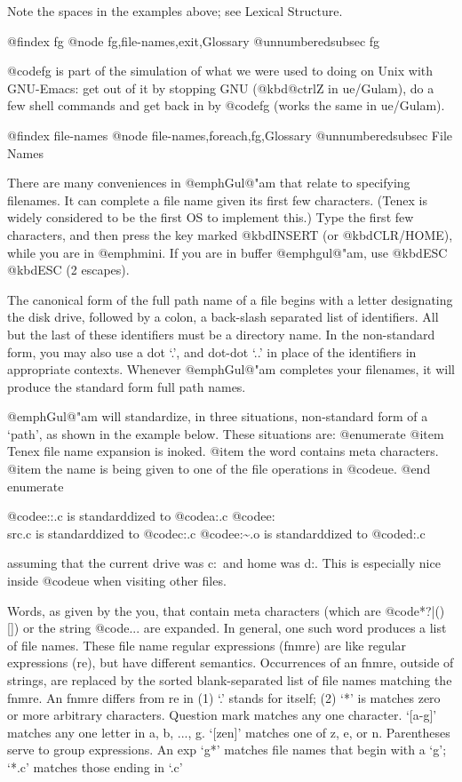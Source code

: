 {{Note the spaces in the examples above; see Lexical Structure.  

@findex fg
@node fg,file-names,exit,Glossary
@unnumberedsubsec fg

@code{fg} is part of the simulation of what we were used to doing on Unix
with GNU-Emacs: get out of it by stopping GNU (@kbd{@ctrl{Z}} in ue/Gulam),
do a few shell commands and get back in by @code{fg} (works the same in
ue/Gulam).


@findex file-names
@node file-names,foreach,fg,Glossary
@unnumberedsubsec File Names

There are many conveniences in @emph{Gul@"am} that relate to specifying
filenames.  It can complete a file name given its first few characters.
(Tenex is widely considered to be the first OS to implement this.) Type the
first few characters, and then press the key marked @kbd{INSERT} (or
@kbd{CLR/HOME}), while you are in @emph{mini}.  If you are in buffer
@emph{gul@"am}, use @kbd{ESC} @kbd{ESC} (2 escapes).

The canonical form of the full path name of a file begins with a letter
designating the disk drive, followed by a colon, a back-slash separated
list of identifiers.  All but the last of these identifiers must be a
directory name.  In the non-standard form, you may also use a dot `.', and
dot-dot `..' in place of the identifiers in appropriate contexts.  Whenever
@emph{Gul@"am} completes your filenames, it will produce the standard form
full path names.

@emph{Gul@"am} will standardize, in three situations, non-standard form of
a `path', as shown in the example below.  These situations are:
@enumerate
@item
Tenex file name expansion is inoked.
@item
the word contains meta characters.
@item
the name is being given to one of the file operations in @code{ue}.
@end enumerate

@code{e:\gulam\a:\lex.c} is standarddized to @code{a:\lex.c}
@code{e:\gulam\\src\util.c} is standarddized to @code{c:\src\util.c}
@code{e:\gulam\~\ex.o} is standarddized to @code{d:\bin\ex.c}

assuming that the current drive was c:\, and home was d:\bin.  This is
especially nice inside @code{ue} when visiting other files.

Words, as given by the you, that contain meta characters (which are
@code{*?|()[]}) or the string @code{...} are expanded.  In general, one
such word produces a list of file names.  These file name regular
expressions (fnmre) are like regular expressions (re), but have different
semantics.  Occurrences of an fnmre, outside of strings, are replaced by
the sorted blank-separated list of file names matching the fnmre.  An fnmre
differs from re in (1) `.' stands for itself; (2) `*' is matches zero or
more arbitrary characters.  Question mark matches any one character.
`[a-g]' matches any one letter in a, b, ..., g.  `[zen]' matches one of z,
e, or n.  Parentheses serve to group expressions.  An exp `g*' matches file
names that begin with a `g'; `*.c' matches those ending in `.c'

}}

